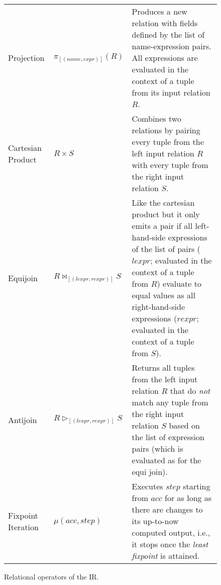 \begin{figure}[htpb]
\begin{tabular}{@{}p{}p{}p{}@{}}
		Projection         & \(\pi_{[(\mathit{name},\mathit{expr})]}(R)\)                & Produces a new relation with fields defined by the list of name-expression pairs. All expressions are evaluated in the context of a tuple from its input relation \(R\).                                                                                                                                          \\
		Cartesian Product  & \(R \times S\)                                              & Combines two relations by pairing every tuple from the left input relation \(R\) with every tuple from the right input relation \(S\).                                                                                                                                                                            \\
		Equijoin           & \(R \bowtie_{[(\mathit{lexpr}, \mathit{rexpr})]} S\)        & Like the cartesian product but it only emits a pair if all left-hand-side expressions of the list of pairs (\(\mathit{lexpr}\); evaluated in the context of a tuple from \(R\)) evaluate to equal values as all right-hand-side expressions (\(\mathit{rexpr}\); evaluated in the context of a tuple from \(S\)). \\
		Antijoin           & \(R \triangleright_{[(\mathit{lexpr}, \mathit{rexpr})]} S\) & Returns all tuples from the left input relation \(R\) that do \emph{not} match any tuple from the right input relation \(S\) based on the list of expression pairs (which is evaluated as for the equi join).                                                                                                     \\
		Fixpoint Iteration & \(\mu(\mathit{acc}, \mathit{step})\)                        & Executes \(\mathit{step}\) starting from \(\mathit{acc}\) for as long as there are changes to its up-to-now computed output, i.e., it stops once the \emph{least fixpoint} is attained.                                                                                                                           \\
		\bottomrule
	\end{tabular}
	\caption{Relational operators of the \ac{IR}.}\label{tab:ir-operators}
\end{figure}

